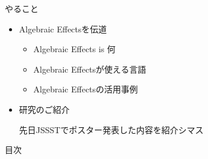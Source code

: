 \switchfooter
\begin{frame}{やること}
    \vfill
    \begin{itemize}
        \item[\faicon{wifi}] \alert{Algebraic Effects}を伝道

            \begin{itemize}
                \item[\coloremoji{🤔}] Algebraic Effects is 何
                \item[\blue{\faicon{language}}] Algebraic Effectsが使える言語
                \item[\coloremoji{🙆}] Algebraic Effectsの活用事例
            \end{itemize}
        \item[\coloremoji{🔬}] 研究のご紹介

            {\small 先日JSSSTでポスター発表した内容を紹介シマス}
    \end{itemize}
    \vfill
\end{frame}

\begin{frame}{目次}
    \begin{multicols}{2}
        \tableofcontents
    \end{multicols}
\end{frame}
\switchfooter

